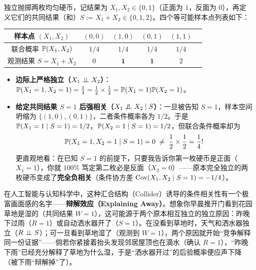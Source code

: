 \begin{example}
\label{ex:ch1-collider-coins}
独立抛掷两枚均匀硬币，记结果为 $X_1, X_2 \in \{0, 1\}$（正面为 $1$，反面为 $0$），再定义它们的共同结果（和）$S := X_1 + X_2 \in \{0, 1, 2\}$。四个等可能样本点列表如下：
\begin{center}
\small
\begin{tabular}{cccccc}
  \toprule
  样本点 $(X_1, X_2)$ & $(0, 0)$ & $(1, 0)$ & $(0, 1)$ & $(1, 1)$ \\
  \midrule
  联合概率 $\mathbb{P}(X_1, X_2)$ & $1/4$ & $1/4$ & $1/4$ & $1/4$ \\
  观测结果 $S = X_1 + X_2$ & $0$ & $\mathbf{1}$ & $\mathbf{1}$ & $2$ \\
  \bottomrule
\end{tabular}
\end{center}
\begin{itemize}
  \item \textbf{边际上严格独立（$X_1 \perp\!\!\!\perp X_2$）}：$\mathbb{P}(X_1=1, X_2=1) = \frac{1}{4} = \frac{1}{2}\times\frac{1}{2} = \mathbb{P}(X_1=1)\mathbb{P}(X_2=1)$。
  \item \textbf{给定共同结果 $S = 1$ 后强相关（$X_1 \not\perp\!\!\!\perp X_2 \mid S$）}：一旦被告知 $S = 1$，样本空间坍缩为 $\{(1,0), (0,1)\}$，二者条件概率各为 $1/2$。于是 $\mathbb{P}(X_1=1\mid S=1) = 1/2$，$\mathbb{P}(X_2=1\mid S=1) = 1/2$，但联合条件概率却为
  \[
    \mathbb{P}(X_1=1, X_2=1 \mid S=1) = 0 \;\neq\; \frac{1}{2}\times\frac{1}{2} = \frac{1}{4}!
  \]
  更直观地看：在已知 $S=1$ 的前提下，只要我告诉你第一枚硬币是正面（$X_1=1$），你就 $100\%$ 笃定第二枚必是反面（$X_2=0$）——原本完全独立的两枚硬币变成了\textbf{完全负相关}（条件协方差 $\operatorname{Cov}(X_1, X_2 \mid S=1) = -1/4$）。
\end{itemize}
\end{example}

在人工智能与认知科学中，这种汇合结构（Collider）诱导的条件相关性有一个极富画面感的名字——\textbf{辩解效应（Explaining Away）}。想象你早晨推开门看到花园草地是湿的（共同结果 $W=1$），这可能源于两个原本相互独立的独立原因：昨晚下过雨（$R=1$）或自动洒水器开了（$S=1$）。在没看到草地时，天气和洒水器独立（$R \perp\!\!\!\perp S$）；可一旦看到草地湿了（观测到 $W=1$），两个原因就开始“竞争解释同一份证据”——倘若你紧接着抬头发现邻居屋顶也在滴水（确认 $R=1$），“昨晚下雨”已经充分解释了草地为什么湿，于是“洒水器开过”的后验概率便应声下降（被下雨“辩解掉”了）。

